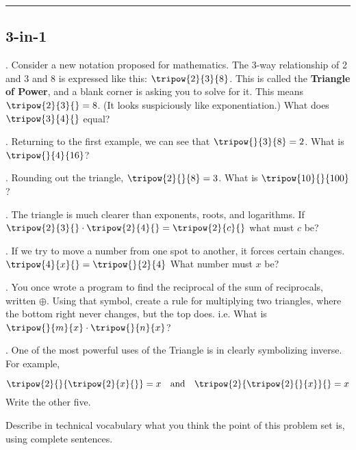 \renewcommand{\columnseprule}{1.5pt}
\begin{multicols*}{2}
\noindent
\rule[0.5\baselineskip]{0.5\textwidth}{1pt}

\noindent
\subsection{3-in-1}
.  Consider a new notation proposed for mathematics.  The 3-way relationship of 2 and 3 and 8 is expressed like this: $\tripow{2}{3}{8}$.  This is called the \textbf{Triangle of Power}, and a blank corner is asking you to solve for it.  This means $\tripow{2}{3}{} = 8$.  (It looks suspiciously like exponentiation.)  What does $\tripow{3}{4}{}$ equal?

\vspace{3cm}
.  Returning to the first example, we can see that $\tripow{}{3}{8}=2$.   What is $\tripow{}{4}{16}$?

\vspace{3cm}
.  Rounding out the triangle, $\tripow{2}{}{8}=3$.  What is $\tripow{10}{}{100}$?

\vspace{3cm}
.  The triangle is much clearer than exponents, roots, and logarithms.  If $\tripow{2}{3}{} \cdot \tripow{2}{4}{} = \tripow{2}{c}{}$ what must $c$ be?

\vspace{2cm}
.  If we try to move a number from one spot to another, it forces certain changes.  $\tripow{4}{x}{} = \tripow{}{2}{4}$  What number must $x$ be?  

\vspace{2cm}
.  You once wrote a program to find the reciprocal of the sum of reciprocals, written $\oplus$.  Using that symbol, create a rule for multiplying two triangles, where the bottom right never changes, but the top does.  i.e. What is $\tripow{}{m}{x}\cdot{}\tripow{}{n}{x}$?

\vspace{3cm}
.  One of the most powerful uses of the Triangle is in clearly symbolizing inverse.  For example,

$$\tripow{2}{}{\tripow{2}{x}{}} = x \quad \text{and} \quad \tripow{2}{\tripow{2}{}{x}}{} = x$$  Write the other
five.

\vspace{8cm}

Describe in technical vocabulary what you think the point of this problem set is, using 
complete sentences.
\end{multicols*}